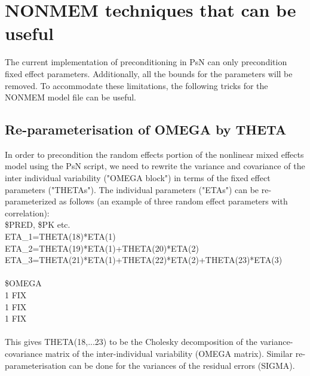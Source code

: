 \section{NONMEM techniques that can be useful}
The current implementation of  preconditioning in PsN can only precondition fixed effect parameters.  Additionally, all the bounds for the parameters will be removed.  To accommodate these limitations, the following tricks for the NONMEM model file can be useful.
\subsection{Re-parameterisation of OMEGA by THETA} \label{app::repara}
In order to precondition the random effects portion of the nonlinear mixed effects model using the PsN script, we need to rewrite the variance and covariance of the inter individual variability ("OMEGA block") in terms of the fixed effect parameters ("THETAs").  The individual parameters ("ETAs") can be re-parameterized as follows (an example of three random effect parameters with correlation):\\
\$PRED, \$PK etc.\\
ETA\_1=THETA(18)*ETA(1)\\
ETA\_2=THETA(19)*ETA(1)+THETA(20)*ETA(2)\\
ETA\_3=THETA(21)*ETA(1)+THETA(22)*ETA(2)+THETA(23)*ETA(3)\\
\\
\$OMEGA\\  1  FIX\\
 1  FIX\\
 1  FIX\\
 \\
This gives THETA(18,...23) to be the Cholesky decomposition of the variance-covariance matrix of the inter-individual variability (OMEGA matrix).  Similar re-parameterisation can be done for the variances of the residual errors (SIGMA).

